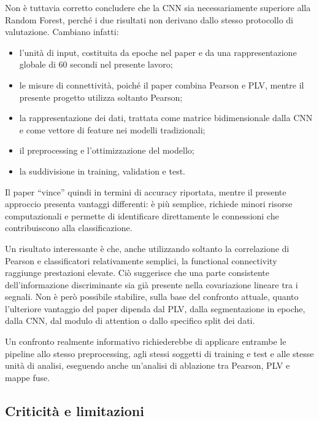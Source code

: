 Non è tuttavia corretto concludere che la CNN sia necessariamente
superiore alla Random Forest, perché i due risultati non derivano
dallo stesso protocollo di valutazione. Cambiano infatti:

\begin{itemize}
	\item l'unità di input, costituita da epoche nel paper e da una
	rappresentazione globale di 60 secondi nel presente lavoro;
	
	\item le misure di connettività, poiché il paper combina Pearson
	e PLV, mentre il presente progetto utilizza soltanto Pearson;
	
	\item la rappresentazione dei dati, trattata come matrice
	bidimensionale dalla CNN e come vettore di feature nei modelli
	tradizionali;
	
	\item il preprocessing e l'ottimizzazione del modello;
	
	\item la suddivisione in training, validation e test.
\end{itemize}

Il paper ``vince'' quindi in termini di accuracy riportata, mentre il
presente approccio presenta vantaggi differenti: è più semplice,
richiede minori risorse computazionali e permette di identificare
direttamente le connessioni che contribuiscono alla classificazione.

Un risultato interessante è che, anche utilizzando soltanto la
correlazione di Pearson e classificatori relativamente semplici, la
functional connectivity raggiunge prestazioni elevate. Ciò suggerisce
che una parte consistente dell'informazione discriminante sia già
presente nella covariazione lineare tra i segnali. Non è però
possibile stabilire, sulla base del confronto attuale, quanto
l'ulteriore vantaggio del paper dipenda dal PLV, dalla segmentazione
in epoche, dalla CNN, dal modulo di attention o dallo specifico split
dei dati.

Un confronto realmente informativo richiederebbe di applicare entrambe
le pipeline allo stesso preprocessing, agli stessi soggetti di
training e test e alle stesse unità di analisi, eseguendo anche
un'analisi di ablazione tra Pearson, PLV e mappe fuse.


\subsection{Criticità e limitazioni}

